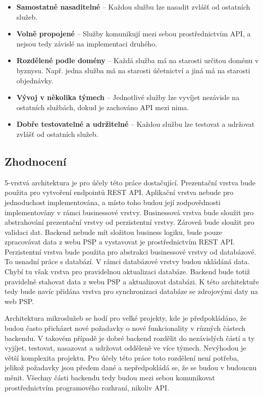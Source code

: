 \begin{itemize}
	\item \textbf{Samostatně nasaditelné} -- Každou službu lze nasadit zvlášť od ostatních služeb.

	\item \textbf{Volně propojené} -- Služby komunikují mezi sebou prostřednictvím API, a nejsou tedy závislé na implementaci druhého.
	
	\item \textbf{Rozdělené podle domény} -- Každá služba má na starosti určitou doménu v byznysu. \linebreak Např. jedna služba má na starosti účetnictví a jiná má na starosti objednávky.
	
	\item \textbf{Vývoj v několika týmech} -- Jednotlivé služby lze vyvíjet nezávisle na ostatních \linebreak službách, dokud je zachováno API mezi nima.
	
	\item \textbf{Dobře testovatelné a udržitelné} -- Každou službu lze testovat a udržovat zvlášť od ostatních služeb.
\end{itemize}

\subsection{Zhodnocení}
5-vrstvá architektura je pro účely této práce dostačující. Prezentační vrstva bude použita pro vytvoření endpointů REST API. Aplikační vrstva nebude pro jednoduchost \linebreak implementována, a místo toho budou její zodpovědnosti implementovány v rámci businessové vrstvy. Businessová vrstva bude sloužit pro abstrahování prezentační vrstvy od perzistentní vrstvy. Zároveň bude sloužit pro validaci dat. Backend nebude mít složitou business \linebreak logiku, bude pouze zpracovávat data z webu PSP a vystavovat je prostřednictvím REST API. Perzistentní vrstva bude použita pro abstrakci businessové vrstvy od databázové. To usnadní práce s databází. V rámci databázové vrstvy budou ukládáná data. Chybí tu však vrstva pro pravidelnou aktualizaci databáze. Backend bude totiž pravidelně stahovat data z webu PSP a aktualizovat databázi. K této architektuře tedy bude navíc přidána vrstva pro synchronizaci databáze se zdrojovými daty na web PSP.

Architektura mikroslužeb se hodí pro velké projekty, kde je předpokládáno, že budou často přicházet nové požadavky o nové funkcionality v různých částech backendu. V takovém případě je dobré backend rozdělit do nezávislých částí a ty vyjíjet, testovat, nasazovat a udržovat odděleně ve více týmech. Nevýhodou je větší komplexita projektu. Pro účely této práce toto rozdělení není potřeba, jelikož požadavky jsou předem dané a nepředpokládá se, že se budou \linebreak v budoucnu měnit. Všechny části backendu tedy budou mezi sebou komunikovat prostřednictvím programového rozhraní, nikoliv API.


